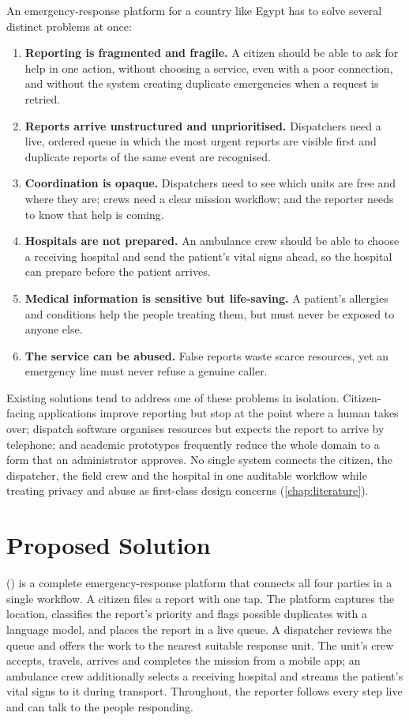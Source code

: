 An emergency-response platform for a country like Egypt has to solve several distinct problems at once:

\begin{enumerate}
  \item \textbf{Reporting is fragmented and fragile.} A citizen should be able to ask for help in one action,
        without choosing a service, even with a poor connection, and without the system creating duplicate
        emergencies when a request is retried.
  \item \textbf{Reports arrive unstructured and unprioritised.} Dispatchers need a live, ordered queue in which
        the most urgent reports are visible first and duplicate reports of the same event are recognised.
  \item \textbf{Coordination is opaque.} Dispatchers need to see which units are free and where they are;
        crews need a clear mission workflow; and the reporter needs to know that help is coming.
  \item \textbf{Hospitals are not prepared.} An ambulance crew should be able to choose a receiving hospital
        and send the patient's vital signs ahead, so the hospital can prepare before the patient arrives.
  \item \textbf{Medical information is sensitive but life-saving.} A patient's allergies and conditions help the
        people treating them, but must never be exposed to anyone else.
  \item \textbf{The service can be abused.} False reports waste scarce resources, yet an emergency line must
        never refuse a genuine caller.
\end{enumerate}

Existing solutions tend to address one of these problems in isolation. Citizen-facing applications improve
reporting but stop at the point where a human takes over; dispatch software organises resources but expects
the report to arrive by telephone; and academic prototypes frequently reduce the whole domain to a form that
an administrator approves. No single system connects the citizen, the dispatcher, the field crew and the
hospital in one auditable workflow while treating privacy and abuse as first-class design concerns
(\cref{chap:literature}).

\section{Proposed Solution}

\textbf{\ProjectName} (\ProjectFullName) is a complete emergency-response platform that connects all four
parties in a single workflow. A citizen files a report with one tap. The platform captures the location,
classifies the report's priority and flags possible duplicates with a language model, and places the report in a
live queue. A dispatcher reviews the queue and offers the work to the nearest suitable response unit. The unit's
crew accepts, travels, arrives and completes the mission from a mobile app; an ambulance crew additionally selects
a receiving hospital and streams the patient's vital signs to it during transport. Throughout, the reporter
follows every step live and can talk to the people responding.

